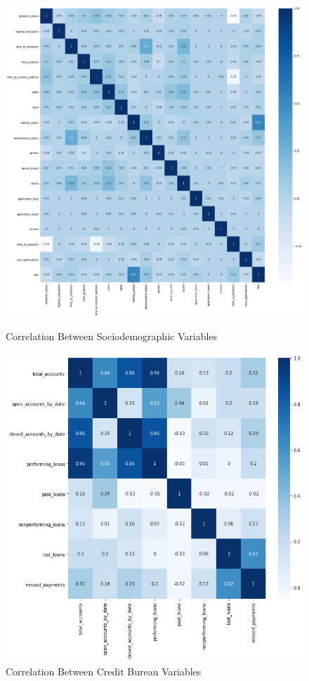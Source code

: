 \begin{figure}[!htb]
\centering
  \begin{minipage}{0.5\textwidth}
    \includegraphics[width=\textwidth]{images/sd_corr.png}
    \caption{Correlation Between Sociodemographic Variables}
    \label{fig:sd_cor}
  \end{minipage}%
  \begin{minipage}{0.5\textwidth}
    \includegraphics[width=\textwidth]{images/credit_corr.png}
    \caption{Correlation Between Credit Bureau Variables}
    \label{fig:cb_cor}
  \end{minipage}
\end{figure}

